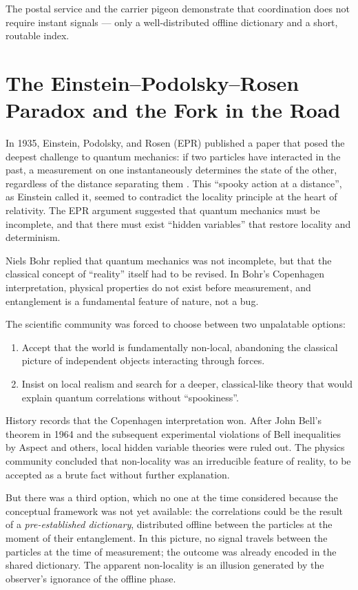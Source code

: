 \documentclass[12pt,a4paper]{article}
\begin{document}
	The postal service and the carrier pigeon demonstrate that coordination does not require instant signals — only a well‑distributed offline dictionary and a short, routable index.
	
	\section{The Einstein–Podolsky–Rosen Paradox and the Fork in the Road}
	
	In 1935, Einstein, Podolsky, and Rosen (EPR) published a paper that posed the deepest challenge to quantum mechanics: if two particles have interacted in the past, a measurement on one instantaneously determines the state of the other, regardless of the distance separating them \cite{EPR1935}. This ``spooky action at a distance'', as Einstein called it, seemed to contradict the locality principle at the heart of relativity. The EPR argument suggested that quantum mechanics must be incomplete, and that there must exist ``hidden variables'' that restore locality and determinism.
	
	Niels Bohr replied that quantum mechanics was not incomplete, but that the classical concept of ``reality'' itself had to be revised. In Bohr's Copenhagen interpretation, physical properties do not exist before measurement, and entanglement is a fundamental feature of nature, not a bug.
	
	The scientific community was forced to choose between two unpalatable options:
	\begin{enumerate}
		\item Accept that the world is fundamentally non-local, abandoning the classical picture of independent objects interacting through forces.
		\item Insist on local realism and search for a deeper, classical-like theory that would explain quantum correlations without ``spookiness''.
	\end{enumerate}
	
	History records that the Copenhagen interpretation won. After John Bell's theorem in 1964 and the subsequent experimental violations of Bell inequalities by Aspect and others, local hidden variable theories were ruled out. The physics community concluded that non-locality was an irreducible feature of reality, to be accepted as a brute fact without further explanation.
	
	But there was a third option, which no one at the time considered because the conceptual framework was not yet available: the correlations could be the result of a \emph{pre-established dictionary}, distributed offline between the particles at the moment of their entanglement. In this picture, no signal travels between the particles at the time of measurement; the outcome was already encoded in the shared dictionary. The apparent non-locality is an illusion generated by the observer's ignorance of the offline phase.
	
\end{document}
